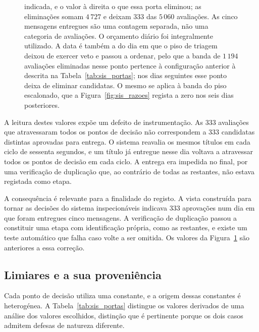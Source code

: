 \begin{figure}[htbp]
{indicada, e o valor à direita o que essa porta eliminou; as eliminações somam $4\,727$ e deixam
$333$ das $5\,060$ avaliações. As cinco mensagens entregues são uma contagem separada,
não uma categoria de avaliações. O orçamento diário foi integralmente utilizado. A data é
também a do dia em que o piso de triagem deixou de exercer veto e passou a ordenar, pelo que a banda
de $1\,194$ avaliações eliminadas nesse ponto pertence à configuração anterior à descrita na
Tabela~\ref{tab:sis_portas}; nos dias seguintes esse ponto deixa de eliminar candidatas. O
mesmo se aplica à banda do piso escalonado, que a Figura~\ref{fig:sis_razoes} regista a
zero nos seis dias posteriores.}
\label{fig:sis_funil}
\end{figure}

A leitura destes valores expõe um defeito de instrumentação. As $333$ avaliações que atravessaram
todos os pontos de decisão não correspondem a $333$ candidatas distintas aprovadas para entrega. O
sistema reavalia os mesmos títulos em cada ciclo de sessenta segundos, e um título já entregue
nesse dia voltava a atravessar todos os pontos de decisão em cada ciclo. A entrega era impedida no
final, por uma verificação de duplicação que, ao contrário de todas as restantes, não estava
registada como etapa.

A consequência é relevante para a finalidade do registo. A vista construída para tornar as
decisões do sistema inspecionáveis indicava $333$ aprovações num dia em que foram entregues cinco
mensagens. A verificação de duplicação passou a constituir uma etapa com identificação própria,
como as restantes, e existe um teste automático que falha caso volte a ser omitida. Os valores da Figura~\ref{fig:sis_funil} são anteriores a essa correção.

\subsection{Limiares e a sua proveniência}

Cada ponto de decisão utiliza uma constante, e a origem dessas constantes é heterogénea. A
Tabela~\ref{tab:sis_portas} distingue os valores derivados de uma análise dos valores escolhidos,
distinção que é pertinente porque os dois casos admitem defesas de natureza diferente.

